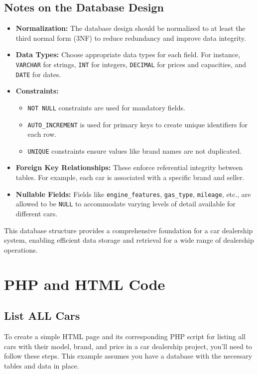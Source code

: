 \documentclass[11pt]{article}
\begin{document}
\subsection{Notes on the Database Design}
\label{sec:org6e3dc71}
\begin{itemize}
\item \textbf{Normalization:} The database design should be normalized to at least
the third normal form (3NF) to reduce redundancy and improve data
integrity.
\item \textbf{Data Types:} Choose appropriate data types for each field. For
instance, \texttt{VARCHAR} for strings, \texttt{INT} for integers, \texttt{DECIMAL} for
prices and capacities, and \texttt{DATE} for dates.
\item \textbf{Constraints:}

\begin{itemize}
\item \texttt{NOT NULL} constraints are used for mandatory fields.
\item \texttt{AUTO\_INCREMENT} is used for primary keys to create unique
identifiers for each row.
\item \texttt{UNIQUE} constraints ensure values like brand names are not
duplicated.
\end{itemize}

\item \textbf{Foreign Key Relationships:} These enforce referential integrity
between tables. For example, each car is associated with a specific
brand and seller.
\item \textbf{Nullable Fields:} Fields like \texttt{engine\_features}, \texttt{gas\_type},
\texttt{mileage}, etc., are allowed to be \texttt{NULL} to accommodate varying
levels of detail available for different cars.
\end{itemize}

This database structure provides a comprehensive foundation for a car
dealership system, enabling efficient data storage and retrieval for a
wide range of dealership operations.

\section{PHP and HTML Code}
\label{sec:org86cff2d}
\subsection{List ALL Cars}
\label{sec:org1ccf60d}
To create a simple HTML page and its corresponding PHP script for
listing all cars with their model, brand, and price in a car dealership
project, you'll need to follow these steps. This example assumes you
have a database with the necessary tables and data in place.
\end{document}
